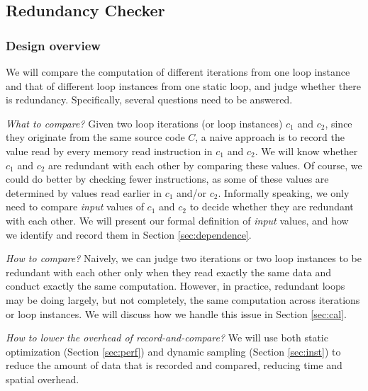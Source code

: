 \subsection{Redundancy Checker}
\label{sec:redundant}

\subsubsection{Design overview}
We will compare the computation of different iterations
from one loop instance and that of different loop instances from 
one static loop,
and judge whether there is redundancy.
Specifically, several questions need to be answered.

\emph{What to compare?}
Given two loop iterations (or loop instances) $c_1$ and $c_2$, since they 
originate from the same source code $C$, 
a naive approach is to record the value read by
every memory read instruction in $c_1$ and $c_2$. 
We will know whether $c_1$ and $c_2$ are redundant with each other by comparing
these values.
Of course, we could do better by checking fewer instructions, as
some of these values are determined by values read earlier in $c_1$ and/or 
$c_2$. Informally speaking, we only need to compare \textit{input}
values of $c_1$ and $c_2$ to decide whether they are redundant with each other. 
We will present our formal definition of \textit{input} values, and
how we identify and record them in
Section \ref{sec:dependence}.


\emph{How to compare?}
Naively, we can judge two iterations or two
loop instances to be redundant with each other only when they read exactly
the same data and conduct exactly the same computation. However,
in practice, redundant loops may be doing largely, but not completely,
the same computation across iterations or loop instances. 
We will discuss how we handle this issue in Section \ref{sec:cal}.



\emph{How to lower the overhead of record-and-compare?}
We will use both static optimization 
(Section \ref{sec:perf})
and dynamic sampling (Section \ref{sec:inst})
to reduce the amount of data that is recorded and compared, reducing
time and spatial overhead.

